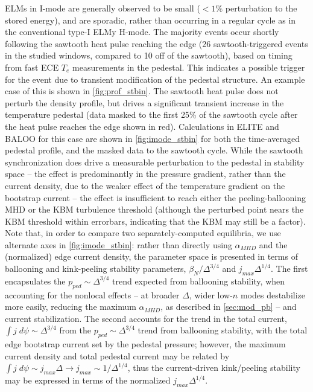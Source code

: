 ELMs in I-mode are generally observed to be small ($<1\%$ perturbation to the stored energy), and are sporadic, rather than occurring in a regular cycle as in the conventional type-I ELMy H-mode.  The majority events occur shortly following the sawtooth heat pulse reaching the edge (26 sawtooth-triggered events in the studied windows, compared to 10 off of the sawtooth), based on timing from fast ECE $T_e$ measurements in the pedestal.  This indicates a possible trigger for the event due to transient modification of the pedestal structure.  An example case of this is shown in \cref{fig:prof_stbin}.  The sawtooth heat pulse does not perturb the density profile, but drives a significant transient increase in the temperature pedestal (data masked to the first 25\% of the sawtooth cycle after the heat pulse reaches the edge shown in red).  Calculations in ELITE and BALOO for this case are shown in \cref{fig:imode_stbin} for both the time-averaged pedestal profile, and the masked data to the sawtooth cycle.  While the sawtooth synchronization does drive a measurable perturbation to the pedestal in stability space -- the effect is predominantly in the pressure gradient, rather than the current density, due to the weaker effect of the temperature gradient on the bootstrap current -- the effect is insufficient to reach either the peeling-ballooning MHD or the KBM turbulence threshold (although the perturbed point nears the KBM threshold within errorbars, indicating that the KBM may still be a factor).  Note that, in order to compare two separately-computed equilibria, we use alternate axes in \cref{fig:imode_stbin}: rather than directly using $\alpha_{MHD}$ and the (normalized) edge current density, the parameter space is presented in terms of ballooning and kink-peeling stability parameters, $\beta_N/\Delta^{3/4}$ and $j_{max} \Delta^{1/4}$.  The first encapsulates the $p_{ped} \sim \Delta^{3/4}$ trend expected from ballooning stability, when accounting for the nonlocal effects -- at broader $\Delta$, wider low-$n$ modes destabilize more easily, reducing the maximum $\alpha_{MHD}$, as described in \cref{sec:mod_pb} -- and current stabilization.  The second accounts for the trend in the total current, $\int j \;d\psi \sim \Delta^{3/4}$ from the $p_{ped} \sim \Delta^{3/4}$ trend from ballooning stability, with the total edge bootstrap current set by the pedestal pressure; however, the maximum current density and total pedestal current may be related by $\int j \; d\psi \sim j_{max} \Delta \rightarrow j_{max} \sim 1/\Delta^{1/4}$, thus the current-driven kink/peeling stability may be expressed in terms of the normalized $j_{max} \Delta^{1/4}$.

